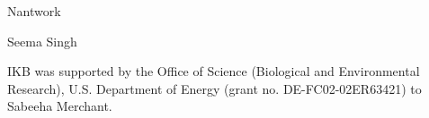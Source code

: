 \documentclass[aps,pra,reprint,superscriptaddress]{revtex4-1}
\begin{document}

\begin{acknowledgments}
Nantwork

Seema Singh

IKB was supported by the Office of Science (Biological and Environmental Research), U.S. Department of Energy (grant no. DE-FC02-02ER63421) to Sabeeha Merchant.
\end{acknowledgments}


\end{document}
